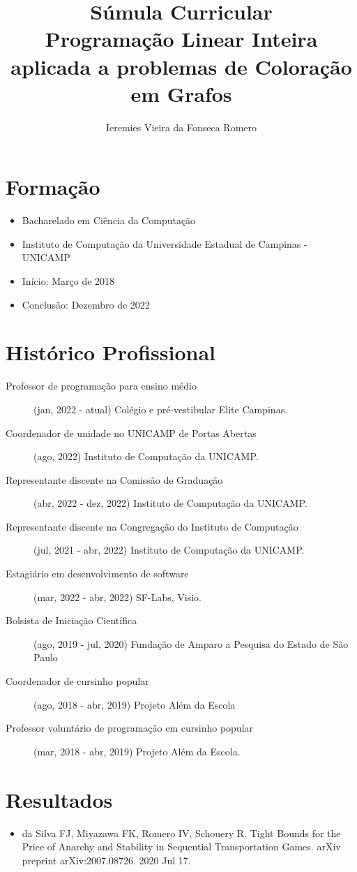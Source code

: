\documentclass[11pt]{article}
\author{Ieremies Vieira da Fonseca Romero}
\date{}
\title{Súmula Curricular\\\medskip
\large Programação Linear Inteira aplicada a problemas de Coloração em Grafos}
\begin{document}
\maketitle

\section*{Formação}
\label{sec:orgd9e0f78}
\begin{itemize}
\item Bacharelado em Ciência da Computação
\item Instituto de Computação da Universidade Estadual de Campinas - UNICAMP
\item Início: Março de 2018
\item Conclusão: Dezembro de 2022
\end{itemize}

\section*{Histórico Profissional}
\label{sec:orgaab7df5}
\begin{description}
\item[{Professor de programação para ensino médio}] (jan, 2022 - atual) Colégio e pré-vestibular Elite Campinas.
\item[{Coordenador de unidade no UNICAMP de Portas Abertas}] (ago, 2022) Instituto de Computação da UNICAMP.
\item[{Representante discente na Comissão de Graduação}] (abr, 2022 - dez, 2022) Instituto de Computação da UNICAMP.
\item[{Representante discente na Congregação do Instituto de Computação}] (jul, 2021 - abr, 2022) Instituto de Computação da UNICAMP.
\item[{Estagiário em desenvolvimento de software}] (mar, 2022 - abr, 2022) SF-Labs, Visio.
\item[{Bolsista de Iniciação Científica}] (ago, 2019 - jul, 2020) Fundação de Amparo a Pesquisa do Estado de São Paulo
\item[{Coordenador de cursinho popular}] (ago, 2018 - abr, 2019) Projeto Além da Escola
\item[{Professor voluntário de programação em cursinho popular}] (mar, 2018 - abr, 2019) Projeto Além da Escola.
\end{description}
\section*{Resultados}
\label{sec:org4d1e77f}
\begin{itemize}
\item da Silva FJ, Miyazawa FK, Romero IV, Schouery R. Tight Bounds for the Price of Anarchy and Stability in Sequential Transportation Games. arXiv preprint arXiv:2007.08726. 2020 Jul 17.
\end{itemize}
\end{document}
